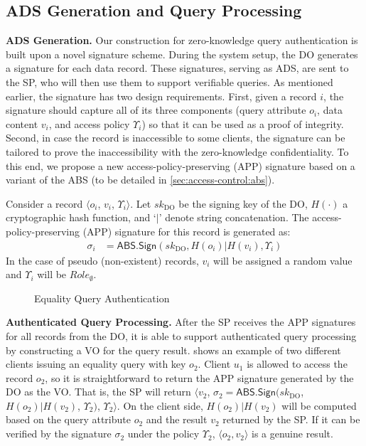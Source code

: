 \subsection{ADS Generation and Query Processing}

\textbf{ADS Generation.} Our construction for zero-knowledge query authentication is built upon a novel signature scheme. During the system setup, the DO generates a signature for each data record. These signatures, serving as ADS, are sent to the SP, who will then use them to support verifiable queries. As mentioned earlier, the signature has two design requirements. First, given a record $i$, the signature should capture all of its three components (query attribute $o_i$, data content $v_i$, and access policy $\Upsilon_i$) so that it can be used as a proof of integrity. Second, in case the record is inaccessible to some clients, the signature can be tailored to prove the inaccessibility with the zero-knowledge confidentiality. To this end, we propose a new access-policy-preserving (APP) signature based on a variant of the ABS (to be detailed in \cref{sec:access-control:abs}).

\begin{definition} Consider a record $\langle o_i$, $v_i$, $\Upsilon_i\rangle$. Let ${sk}_{\textrm{DO}}$ be the signing key of the DO, $H(\cdot)$ a cryptographic hash function, and `$|$' denote string concatenation. The access-policy-preserving (APP) signature for this record is generated as:
  \begin{align*}
    \sigma_i & = \textsf{ABS.Sign}({sk}_{\textrm{DO}}, H(o_i) | H(v_i) , \Upsilon_i)
  \end{align*}
  In the case of pseudo (non-existent) records, $v_i$ will be assigned a random value and $\Upsilon_i$ will be ${Role}_{\emptyset}$.
\end{definition}

\begin{figure}[t]
  \centering
  \resizebox{\linewidth}{!}{}
  \caption{Equality Query Authentication}\label{fig:access-control:equality-query}
\end{figure}

\textbf{Authenticated Query Processing.}
After the SP receives the APP signatures for all records from the DO, it is able to support authenticated query processing by constructing a VO for the query result.
 shows an example of two different clients issuing an equality query with key $o_2$.
Client $u_1$ is allowed to access the record $o_2$, so it is straightforward to return the APP signature generated by the DO as the VO\@. That is, the SP will return $\langle v_2$, $\sigma_2 = \textsf{ABS.Sign}({sk}_\text{DO}$, $H(o_2) | H(v_2)$, $\Upsilon_2)$, $\Upsilon_2\rangle$. On the client side, $H(o_2) | H(v_2)$ will be computed based on the query attribute $o_2$ and the result $v_2$ returned by the SP\@. If it can be verified by the signature $\sigma_2$ under the policy $\Upsilon_2$, $\langle o_2, v_2\rangle$ is a genuine result. %

